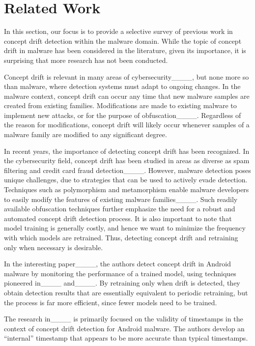 \section{Related Work}
\label{sect:rw}

In this section, our focus is to provide a selective survey of previous work in concept drift detection 
within the malware domain. While the topic of concept drift in malware has been considered in the 
literature, given its importance, it is surprising that more research has not been conducted.

Concept drift is relevant in many areas of cybersecurity____, but none more so than 
malware, where detection systems must adapt to ongoing changes. In the malware context,
concept drift can occur any time that new malware samples are created from existing families. 
Modifications are made to existing malware to implement new attacks, or for the 
purpose of obfuscation____. Regardless of the reason for modifications,
concept drift will likely occur whenever samples of a malware family are 
modified to any significant degree. 

In recent years, the importance of detecting concept drift has been recognized. In the cybersecurity field, 
concept drift has been studied in areas as diverse as spam filtering and credit card fraud detection____. 
However, malware detection poses unique challenges, due to strategies that can be used to actively 
evade detection. Techniques such as polymorphism and metamorphism enable malware developers
to easily modify the features of existing malware families____. Such 
readily available obfuscation techniques further emphasize the need for a robust and automated 
concept drift detection process. It is also important to note that model training is generally
costly, and hence we want to minimize the frequency with which models are retrained.
Thus, detecting concept drift and retraining only when necessary is desirable.

In the interesting paper____, the authors detect concept drift in Android 
malware by monitoring the performance of a trained model, using techniques pioneered 
in____ and____. By retraining only when drift is detected,
they obtain detection results that are essentially equivalent to periodic retraining,
but the process is far more efficient, since fewer models need to be trained.

The research in____ is primarily focused on the validity of timestamps in
the context of concept drift detection for Android malware. The authors develop 
an ``internal'' timestamp that appears to be more accurate than 
typical timestamps.


